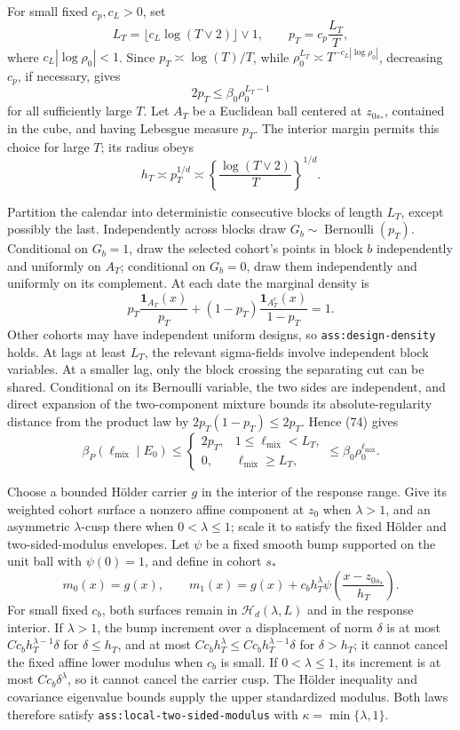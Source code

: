 For small fixed \(c_p,c_L>0\), set
\[
L_T=\lfloor c_L\log(T\vee2)\rfloor\vee1,
\qquad
p_T=c_p\frac{L_T}{T},
\]
where \(c_L|\log\rho_0|<1\).  Since \(p_T\asymp\log(T)/T\), while
\(\rho_0^{L_T}\asymp T^{-c_L|\log\rho_0|}\), decreasing \(c_p\), if necessary, gives
\[
2p_T\leq\beta_0\rho_0^{L_T-1}
\tag{74}
\]
for all sufficiently large \(T\).  Let \(A_T\) be a Euclidean ball centered at \(z_{0s_*}\), contained in the cube, and having Lebesgue measure \(p_T\).  The interior margin permits this choice for large \(T\); its radius obeys
\[
h_T\asymp p_T^{1/d}
\asymp\left\{\frac{\log(T\vee2)}T\right\}^{1/d}.
\tag{75}
\]

Partition the calendar into deterministic consecutive blocks of length \(L_T\), except possibly the last.  Independently across blocks draw \(G_b\sim\operatorname{Bernoulli}(p_T)\).  Conditional on \(G_b=1\), draw the selected cohort's points in block \(b\) independently and uniformly on \(A_T\); conditional on \(G_b=0\), draw them independently and uniformly on its complement.  At each date the marginal density is
\[
p_T\frac{\mathbf1_{A_T}(x)}{p_T}
+(1-p_T)\frac{\mathbf1_{A_T^c}(x)}{1-p_T}=1.
\tag{76}
\]
Other cohorts may have independent uniform designs, so \texttt{ass:design-density} holds.  At lags at least \(L_T\), the relevant sigma-fields involve independent block variables.  At a smaller lag, only the block crossing the separating cut can be shared.  Conditional on its Bernoulli variable, the two sides are independent, and direct expansion of the two-component mixture bounds its absolute-regularity distance from the product law by \(2p_T(1-p_T)\leq2p_T\).  Hence (74) gives
\[
\beta_P(\ell_{\mathrm{mix}}\mid E_0)
\leq
\begin{cases}
2p_T,&1\leq\ell_{\mathrm{mix}}<L_T,\\
0,&\ell_{\mathrm{mix}}\geq L_T,
\end{cases}
\leq\beta_0\rho_0^{\ell_{\mathrm{mix}}}.
\tag{77}
\]

Choose a bounded H\"older carrier \(g\) in the interior of the response range.  Give its weighted cohort surface a nonzero affine component at \(z_0\) when \(\lambda>1\), and an asymmetric \(\lambda\)-cusp there when \(0<\lambda\leq1\); scale it to satisfy the fixed H\"older and two-sided-modulus envelopes.  Let \(\psi\) be a fixed smooth bump supported on the unit ball with \(\psi(0)=1\), and define in cohort \(s_*\)
\[
m_0(x)=g(x),
\qquad
m_1(x)=g(x)+c_bh_T^\lambda
\psi\!\left(\frac{x-z_{0s_*}}{h_T}\right).
\tag{78}
\]
For small fixed \(c_b\), both surfaces remain in \(\mathcal H_d(\lambda,L)\) and in the response interior.  If \(\lambda>1\), the bump increment over a displacement of norm \(\delta\) is at most
\(Cc_bh_T^{\lambda-1}\delta\) for \(\delta\leq h_T\), and at most
\(Cc_bh_T^\lambda\leq Cc_bh_T^{\lambda-1}\delta\) for \(\delta>h_T\); it cannot cancel the fixed affine lower modulus when \(c_b\) is small.  If \(0<\lambda\leq1\), its increment is at most \(Cc_b\delta^\lambda\), so it cannot cancel the carrier cusp.  The H\"older inequality and covariance eigenvalue bounds supply the upper standardized modulus.  Both laws therefore satisfy \texttt{ass:local-two-sided-modulus} with \(\kappa=\min\{\lambda,1\}\).

